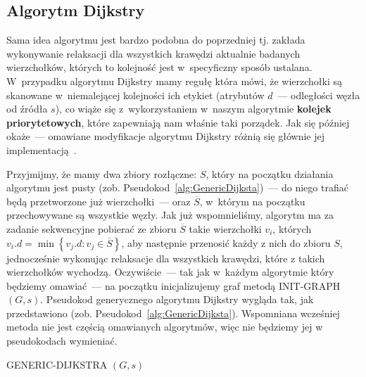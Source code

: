 \subsection{Algorytm Dijkstry}
\label{sub:dijkstraAlgorithm}



Sama idea algorytmu jest bardzo podobna do poprzedniej tj. zakłada wykonywanie relaksacji dla wszystkich krawędzi aktualnie badanych wierzchołków, których to kolejność jest w~specyficzny sposób ustalana.
W~przypadku algorytmu Dijkstry mamy regułę która mówi, że wierzchołki są skanowane w~niemalejącej kolejności ich etykiet (atrybutów $d$~--- odległości węzła od źródła $s$), co wiąże się z~wykorzystaniem w~naszym algorytmie \textbf{kolejek priorytetowych}, które zapewniają nam właśnie taki porządek.
Jak się później okaże~--- omawiane modyfikacje algorytmu Dijkstry różnią się głównie jej implementacją~\cite[$2.1$]{OR}.

Przyjmijmy, że mamy dwa zbiory rozłączne: $S$, który na początku działania algorytmu jest pusty (zob. Pseudokod~\ref{alg:GenericDijksta})~--- do niego trafiać będą przetworzone już wierzchołki~--- oraz $\overline{S}$, w~którym na początku przechowywane są wszystkie węzły.
Jak już wspomnieliśmy, algorytm ma za zadanie sekwencyjne pobierać ze zbioru $\overline{S}$ takie wierzchołki $v_{i}$, których $v_{i}.d = \min \left\{ v_{j}.d : v_{j} \in \overline{S} \right\}$, aby następnie przenosić każdy z nich do zbioru $S$, jednocześnie wykonując relaksacje dla wszystkich krawędzi, które z takich wierzchołków wychodzą.
Oczywiście~--- tak jak w~każdym algorytmie który będziemy omawiać~--- na początku inicjalizujemy graf metodą \textsc{INIT-GRAPH} $\left( G, s \right)$.
Pseudokod generycznego algorytmu Dijkstry wygląda tak, jak przedstawiono (zob. Pseudokod~\ref{alg:GenericDijksta}). Wspomniana wcześniej metoda nie jest częścią omawianych algorytmów, więc nie będziemy jej w pseudokodach wymieniać.

\begin{pseudokod}[!htbp]
	\DontPrintSemicolon
	\caption{
		GENERIC-DIJKSTRA $\left( G, s \right)$
	}
	\label{alg:GenericDijksta}
\end{pseudokod}

